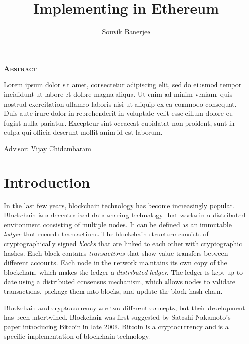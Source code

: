 \documentclass[12pt]{article}
\title{Implementing \System in Ethereum}
\author{Souvik Banerjee}
\date{}
\begin{document}
\maketitle
\thispagestyle{empty}

\begin{center}
  \textsc{\textbf{Abstract}}
\end{center}
Lorem ipsum dolor sit amet, consectetur adipiscing elit, sed do eiusmod tempor incididunt ut labore et dolore magna aliqua. Ut enim ad minim veniam, quis nostrud exercitation ullamco laboris nisi ut aliquip ex ea commodo consequat. Duis aute irure dolor in reprehenderit in voluptate velit esse cillum dolore eu fugiat nulla pariatur. Excepteur sint occaecat cupidatat non proident, sunt in culpa qui officia deserunt mollit anim id est laborum. %

\par\bigskip\noindent\vspace{3in}
\begin{center}
  Advisor: Vijay Chidambaram
\end{center}

\newpage
\thispagestyle{empty}
\tableofcontents

\newpage



\section{Introduction}


In the last few years, blockchain technology has become increasingly popular.
Blockchain is a decentralized data sharing technology that works in a distributed environment consisting of multiple nodes. It can be defined as an immutable \emph{ledger} that records transactions. The blockchain structure consists of cryptographically signed \emph{blocks} that are linked to each other with cryptographic hashes. Each block contains \emph{transactions} that show value transfers between different accounts. Each node in the network maintains its own copy of the blockchain, which makes the ledger a \emph{distributed ledger}. The ledger is kept up to date using a distributed consensus mechanism, which allows nodes to validate transactions, package them into blocks, and update the block hash chain.

Blockchain and cryptocurrency are two different concepts, but their development has been intertwined. Blockchain was first suggested by Satoshi Nakamoto's paper introducing Bitcoin in late 2008. Bitcoin is a cryptocurrency and is a specific implementation of blockchain technology.
\end{document}
